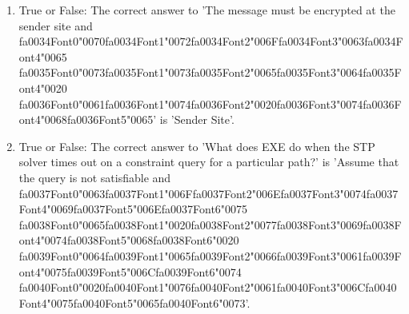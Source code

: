 \documentclass[12pt]{article}
\begin{document}
\begin{enumerate}[label=\arabic*.]
\item True or False: The correct answer to 'The message must be encrypted at the sender site and {\csname fa0034Font0\endcsname\char"0070}{\csname fa0034Font1\endcsname\char"0072}{\csname fa0034Font2\endcsname\char"006F}{\csname fa0034Font3\endcsname\char"0063}{\csname fa0034Font4\endcsname\char"0065} {\csname fa0035Font0\endcsname\char"0073}{\csname fa0035Font1\endcsname\char"0073}{\csname fa0035Font2\endcsname\char"0065}{\csname fa0035Font3\endcsname\char"0064}{\csname fa0035Font4\endcsname\char"0020} {\csname fa0036Font0\endcsname\char"0061}{\csname fa0036Font1\endcsname\char"0074}{\csname fa0036Font2\endcsname\char"0020}{\csname fa0036Font3\endcsname\char"0074}{\csname fa0036Font4\endcsname\char"0068}{\csname fa0036Font5\endcsname\char"0065}' is 'Sender Site'.
\item True or False: The correct answer to 'What does EXE do when the STP solver times out on a constraint query for a particular path?' is 'Assume that the query is not satisfiable and {\csname fa0037Font0\endcsname\char"0063}{\csname fa0037Font1\endcsname\char"006F}{\csname fa0037Font2\endcsname\char"006E}{\csname fa0037Font3\endcsname\char"0074}{\csname fa0037Font4\endcsname\char"0069}{\csname fa0037Font5\endcsname\char"006E}{\csname fa0037Font6\endcsname\char"0075} {\csname fa0038Font0\endcsname\char"0065}{\csname fa0038Font1\endcsname\char"0020}{\csname fa0038Font2\endcsname\char"0077}{\csname fa0038Font3\endcsname\char"0069}{\csname fa0038Font4\endcsname\char"0074}{\csname fa0038Font5\endcsname\char"0068}{\csname fa0038Font6\endcsname\char"0020} {\csname fa0039Font0\endcsname\char"0064}{\csname fa0039Font1\endcsname\char"0065}{\csname fa0039Font2\endcsname\char"0066}{\csname fa0039Font3\endcsname\char"0061}{\csname fa0039Font4\endcsname\char"0075}{\csname fa0039Font5\endcsname\char"006C}{\csname fa0039Font6\endcsname\char"0074} {\csname fa0040Font0\endcsname\char"0020}{\csname fa0040Font1\endcsname\char"0076}{\csname fa0040Font2\endcsname\char"0061}{\csname fa0040Font3\endcsname\char"006C}{\csname fa0040Font4\endcsname\char"0075}{\csname fa0040Font5\endcsname\char"0065}{\csname fa0040Font6\endcsname\char"0073}'.
\end{enumerate}
\end{document}
